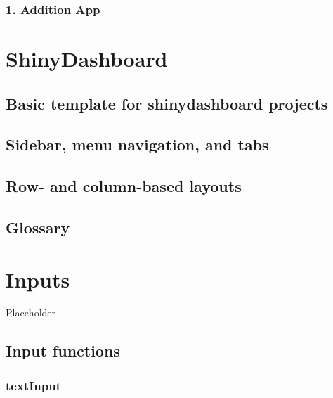 \documentclass[
]{book}
\begin{document}
\hypertarget{addition-app}{%
\subsection{1. Addition App}\label{addition-app}}

\hypertarget{shinydashboard}{%
\chapter{ShinyDashboard}\label{shinydashboard}}

\hypertarget{basic-template-for-shinydashboard-projects}{%
\section{Basic template for shinydashboard projects}\label{basic-template-for-shinydashboard-projects}}

\hypertarget{sidebar-menu-navigation-and-tabs}{%
\section{Sidebar, menu navigation, and tabs}\label{sidebar-menu-navigation-and-tabs}}

\hypertarget{row--and-column-based-layouts}{%
\section{Row- and column-based layouts}\label{row--and-column-based-layouts}}

\hypertarget{glossary-shinydashboard}{%
\section{Glossary}\label{glossary-shinydashboard}}

\hypertarget{inputs}{%
\chapter{Inputs}\label{inputs}}

Placeholder

\hypertarget{input-functions}{%
\section{Input functions}\label{input-functions}}

\hypertarget{textinput}{%
\subsection{textInput}\label{textinput}}
\end{document}
